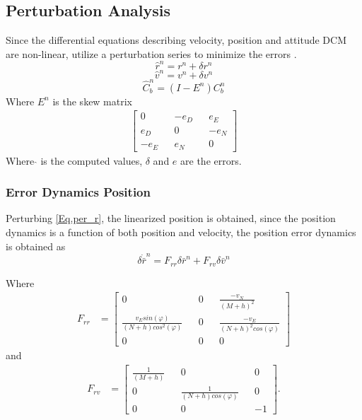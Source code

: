 \subsection*{Perturbation Analysis}
Since the differential equations describing velocity, position and attitude DCM are non-linear, utilize a perturbation series to minimize the errors \cite{pertubation}.
\begin{equation}
\hat{r}^n =r^n+\delta r^n
\label{Eq.per_r}
\end{equation}
\begin{equation}
\hat{v}^n =v^n+\delta v^n
\label{Eq.per_v}
\end{equation}
\begin{equation}
\hat{C}_b^n = (I-E^n)C_b^n
\label{Eq.per_c}
\end{equation}
Where $E^n$ is the skew matrix
\begin{align}
\begin{bmatrix} 
0 && -e_D && e_E \\
e_D && 0 && -e_N \\
-e_E && e_N && 0
\end{bmatrix}
\end{align}
Where $\hat{}$ is the computed values, $\delta$ and $e$ are the errors.

\subsubsection{Error Dynamics Position}
Perturbing \eqref{Eq.per_r}, the linearized position is obtained, since the position dynamics is a function of both position and velocity, the position error dynamics is obtained as
\begin{equation}
\delta \dot{\bar{r}}^n = F_{rr}\delta \bar{r}^n + F_{rv}\delta \bar{v}^n
\end{equation}

\noindent Where
\begin{align}
F_{rr} &=
\begin{bmatrix}
0 && 0 && \frac{-v_N}{(M+h)^2}\\
\frac{v_E sin(\varphi)}{(N+h)cos^2(\varphi)} && 0 && \frac{-v_E}{(N+h)^2cos(\varphi)} \\
0 && 0 && 0
\end{bmatrix}
\label{Eq.Frr}
\end{align}
and
\begin{align}
F_{rv} &=
\begin{bmatrix}
\frac{1}{(M+h)} && 0 && 0\\
0 && \frac{1}{(N+h)cos(\varphi)} && 0 \\
0 && 0 && -1
\end{bmatrix}.
\label{Eq.Frv}
\end{align}
